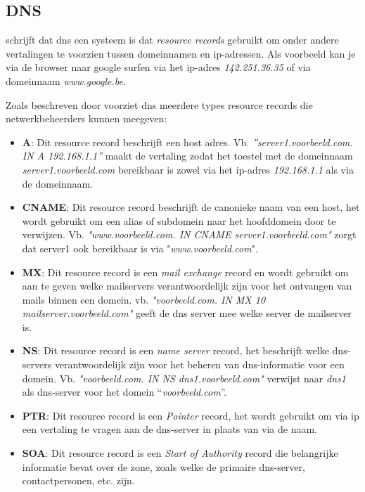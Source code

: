 \subsection{DNS}
\textcite{Mockapetris1987} schrijft dat \acrshort{dns} een systeem is dat \textit{resource records} gebruikt om onder andere vertalingen te voorzien tussen domeinnamen en \acrshort{ip}-adressen. Als voorbeeld kan je via de browser naar google surfen via het \acrshort{ip}-adres \textit{142.251.36.35} of via domeinnaam \textit{www.google.be}.

Zoals beschreven door \textcite{Mockapetris1987} voorziet \acrshort{dns} meerdere types resource records die netwerkbeheerders kunnen meegeven: 
\begin{itemize}
    \item \textbf{A}: Dit resource record beschrijft een host adres. 
    Vb. \textit{”server1.voorbeeld.com. IN A 192.168.1.1”} maakt de vertaling zodat het toestel met de domeinnaam \textit{server1.voorbeeld.com} bereikbaar is zowel via het \acrshort{ip}-adres \textit{192.168.1.1} als via de domeinnaam. 
    \item \textbf{CNAME}: Dit resource record beschrijft de canonieke naam van een host, het wordt gebruikt om een alias of subdomein naar het hoofddomein door te verwijzen. Vb. \textit{"www.voorbeeld.com. IN CNAME server1.voorbeeld.com"} zorgt dat server1 ook bereikbaar is via "\textit{www.voorbeeld.com}".
    \item \textbf{MX}: Dit resource record is een \textit{mail exchange} record en wordt gebruikt om aan te geven welke mailservers verantwoordelijk zijn voor het ontvangen van mails binnen een domein. vb. \textit{"voorbeeld.com. IN MX 10 mailserver.voorbeeld.com"} geeft de \acrshort{dns} server mee welke server de mailserver is.
    \item \textbf{NS}: Dit resource record is een \textit{name server} record, het beschrijft welke \acrshort{dns}-servers verantwoordelijk zijn voor het beheren van \acrshort{dns}-informatie voor een domein. Vb. \textit{"voorbeeld.com. IN NS dns1.voorbeeld.com"} verwijst naar \textit{dns1} als \acrshort{dns}-server voor het domein “\textit{voorbeeld.com}”.
    \item \textbf{PTR}: Dit resource record is een \textit{Pointer} record, het wordt gebruikt om via \acrshort{ip} een vertaling te vragen aan de \acrshort{dns}-server in plaats van via de naam.
    \item \textbf{SOA}: Dit resource record is een \textit{Start of Authority} record die belangrijke informatie bevat over de zone, zoals welke de primaire \acrshort{dns}-server, contactpersonen, etc. zijn.
\end{itemize}

